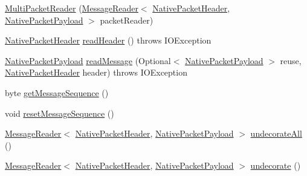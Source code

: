 \begin{DoxyCompactItemize}
\item 
\mbox{\hyperlink{classcom_1_1mysql_1_1cj_1_1protocol_1_1a_1_1_multi_packet_reader_a73909539b9b69319ac63a6e29f2f1088}{Multi\+Packet\+Reader}} (\mbox{\hyperlink{interfacecom_1_1mysql_1_1cj_1_1protocol_1_1_message_reader}{Message\+Reader}}$<$ \mbox{\hyperlink{classcom_1_1mysql_1_1cj_1_1protocol_1_1a_1_1_native_packet_header}{Native\+Packet\+Header}}, \mbox{\hyperlink{classcom_1_1mysql_1_1cj_1_1protocol_1_1a_1_1_native_packet_payload}{Native\+Packet\+Payload}} $>$ packet\+Reader)
\item 
\mbox{\hyperlink{classcom_1_1mysql_1_1cj_1_1protocol_1_1a_1_1_native_packet_header}{Native\+Packet\+Header}} \mbox{\hyperlink{classcom_1_1mysql_1_1cj_1_1protocol_1_1a_1_1_multi_packet_reader_a6a0250ba430aacfb45f8e1c0a7907465}{read\+Header}} ()  throws I\+O\+Exception 
\item 
\mbox{\hyperlink{classcom_1_1mysql_1_1cj_1_1protocol_1_1a_1_1_native_packet_payload}{Native\+Packet\+Payload}} \mbox{\hyperlink{classcom_1_1mysql_1_1cj_1_1protocol_1_1a_1_1_multi_packet_reader_a8a2162a4cec91c1cd468b3e00bed871f}{read\+Message}} (Optional$<$ \mbox{\hyperlink{classcom_1_1mysql_1_1cj_1_1protocol_1_1a_1_1_native_packet_payload}{Native\+Packet\+Payload}} $>$ reuse, \mbox{\hyperlink{classcom_1_1mysql_1_1cj_1_1protocol_1_1a_1_1_native_packet_header}{Native\+Packet\+Header}} header)  throws I\+O\+Exception 
\item 
byte \mbox{\hyperlink{classcom_1_1mysql_1_1cj_1_1protocol_1_1a_1_1_multi_packet_reader_a237c52b4c174c917ec8a15a5eb2839d1}{get\+Message\+Sequence}} ()
\item 
void \mbox{\hyperlink{classcom_1_1mysql_1_1cj_1_1protocol_1_1a_1_1_multi_packet_reader_ac0fa7a5f40fc65548bdb17241152b81c}{reset\+Message\+Sequence}} ()
\item 
\mbox{\hyperlink{interfacecom_1_1mysql_1_1cj_1_1protocol_1_1_message_reader}{Message\+Reader}}$<$ \mbox{\hyperlink{classcom_1_1mysql_1_1cj_1_1protocol_1_1a_1_1_native_packet_header}{Native\+Packet\+Header}}, \mbox{\hyperlink{classcom_1_1mysql_1_1cj_1_1protocol_1_1a_1_1_native_packet_payload}{Native\+Packet\+Payload}} $>$ \mbox{\hyperlink{classcom_1_1mysql_1_1cj_1_1protocol_1_1a_1_1_multi_packet_reader_a2a1c000ea384788f1ef5d8add224d309}{undecorate\+All}} ()
\item 
\mbox{\hyperlink{interfacecom_1_1mysql_1_1cj_1_1protocol_1_1_message_reader}{Message\+Reader}}$<$ \mbox{\hyperlink{classcom_1_1mysql_1_1cj_1_1protocol_1_1a_1_1_native_packet_header}{Native\+Packet\+Header}}, \mbox{\hyperlink{classcom_1_1mysql_1_1cj_1_1protocol_1_1a_1_1_native_packet_payload}{Native\+Packet\+Payload}} $>$ \mbox{\hyperlink{classcom_1_1mysql_1_1cj_1_1protocol_1_1a_1_1_multi_packet_reader_a88dba17bd898d3e8516fdb4a096297c5}{undecorate}} ()
\end{DoxyCompactItemize}


